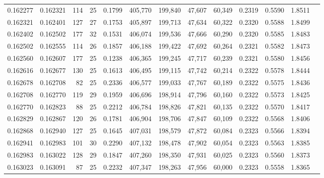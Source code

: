 \begin{tabular}{rrrrrrrrrrrrr}
0.162277 & 0.162321 & 114 &  25 &                                     0.1799 & 405,770 & 199,840 &  47,607 &  60,349 & 0.2319 & 0.5590 & 1.8511 \\
0.162321 & 0.162401 & 127 &  27 &                                     0.1753 & 405,897 & 199,713 &  47,634 &  60,322 & 0.2320 & 0.5588 & 1.8499 \\
0.162402 & 0.162502 & 177 &  32 &                                     0.1531 & 406,074 & 199,536 &  47,666 &  60,290 & 0.2320 & 0.5585 & 1.8483 \\
0.162502 & 0.162555 & 114 &  26 &                                     0.1857 & 406,188 & 199,422 &  47,692 &  60,264 & 0.2321 & 0.5582 & 1.8473 \\
0.162560 & 0.162607 & 177 &  25 &                                     0.1238 & 406,365 & 199,245 &  47,717 &  60,239 & 0.2321 & 0.5580 & 1.8456 \\
0.162616 & 0.162677 & 130 &  25 &                                     0.1613 & 406,495 & 199,115 &  47,742 &  60,214 & 0.2322 & 0.5578 & 1.8444 \\
0.162678 & 0.162708 &  82 &  25 &                                     0.2336 & 406,577 & 199,033 &  47,767 &  60,189 & 0.2322 & 0.5575 & 1.8436 \\
0.162708 & 0.162770 & 119 &  29 &                                     0.1959 & 406,696 & 198,914 &  47,796 &  60,160 & 0.2322 & 0.5573 & 1.8425 \\
0.162770 & 0.162823 &  88 &  25 &                                     0.2212 & 406,784 & 198,826 &  47,821 &  60,135 & 0.2322 & 0.5570 & 1.8417 \\
0.162829 & 0.162867 & 120 &  26 &                                     0.1781 & 406,904 & 198,706 &  47,847 &  60,109 & 0.2322 & 0.5568 & 1.8406 \\
0.162868 & 0.162940 & 127 &  25 &                                     0.1645 & 407,031 & 198,579 &  47,872 &  60,084 & 0.2323 & 0.5566 & 1.8394 \\
0.162941 & 0.162983 & 101 &  30 &                                     0.2290 & 407,132 & 198,478 &  47,902 &  60,054 & 0.2323 & 0.5563 & 1.8385 \\
0.162983 & 0.163022 & 128 &  29 &                                     0.1847 & 407,260 & 198,350 &  47,931 &  60,025 & 0.2323 & 0.5560 & 1.8373 \\
0.163023 & 0.163091 &  87 &  25 &                                     0.2232 & 407,347 & 198,263 &  47,956 &  60,000 & 0.2323 & 0.5558 & 1.8365 \\

\end{tabular}
